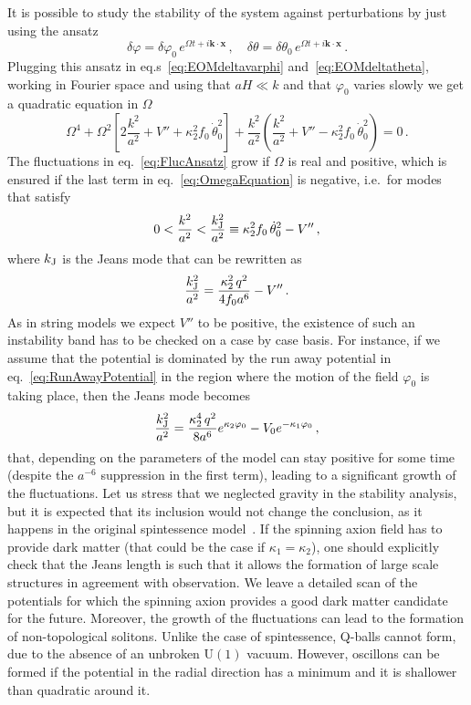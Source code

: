 \documentclass[11pt,a4paper]{article}
\begin{document}
It is possible to study the stability of the system against perturbations by just using the ansatz
\begin{equation}
\label{eq:FlucAnsatz}
\delta \varphi = \delta \varphi_0 \, e^{\Omega t + i \mathbf{k \cdot x}} \,, \quad \delta \theta = \delta \theta_0\, e^{\Omega t + i \mathbf{k \cdot x}} \,.
\end{equation}
Plugging this ansatz in eq.s~\eqref{eq:EOMdeltavarphi} and~\eqref{eq:EOMdeltatheta}, working in Fourier space and using that $a H \ll k$ and that $\varphi_0$ varies slowly we get a quadratic equation in $\Omega$
\begin{equation}
\label{eq:OmegaEquation}
\Omega^4 + \Omega^2 \left[2 \frac{k^2}{a^2} + V'' + \kappa_2^2 f_0 \,\dot\theta_0^2\right] + \frac{k^2}{a^2} \left(\frac{k^2}{a^2} + V'' - \kappa_2^2 f_0\, \dot\theta_0^2\right) = 0 \,.
\end{equation}
The fluctuations in eq.~\eqref{eq:FlucAnsatz} grow if $\Omega$ is real and positive, which is ensured if the last term in eq.~\eqref{eq:OmegaEquation} is negative, i.e.~for modes that satisfy
\begin{equation}
0 < \frac{k^2}{a^2} < \frac{k_{\rm J}^2}{a^2} \equiv \kappa_2^2 f_0 \, \dot\theta_0^2 - V'' \,,
\end{equation}
where $k_{\rm J}$ is the Jeans mode that can be rewritten as
\begin{equation}
\frac{k_{\rm J}^2}{a^2} = \frac{\kappa_2^2\, q^2}{4 f_0 a^6} - V'' \,.
\end{equation}
As in string models we expect $V''$ to be positive, the existence of such an instability band has to be checked on a case by case basis. For instance, if we assume that the potential is dominated by the run away potential in eq.~\eqref{eq:RunAwayPotential} in the region where the motion of the field $\varphi_0$ is taking place, then the Jeans mode becomes
\begin{equation}
\frac{k_{\rm J}^2}{a^2} = \frac{\kappa_2^4 \, q^2}{8 a^6} e^{\kappa_2 \varphi_0} - V_0 e^{-\kappa_1 \varphi_0} \,,
\end{equation}
that, depending on the parameters of the model can stay positive for some time (despite the $a^{-6}$ suppression in the first term), leading to a significant growth of the fluctuations. Let us stress that we neglected gravity in the stability analysis, but it is expected that its inclusion would not change the conclusion, as it happens in the original spintessence model~\cite{Boyle:2001du}. If the spinning axion field has to provide dark matter (that could be the case if $\kappa_1 = \kappa_2$), one should explicitly check that the Jeans length is such that it allows the formation of large scale structures in agreement with observation. We leave a detailed scan of the potentials for which the spinning axion provides a good dark matter candidate for the future. Moreover, the growth of the fluctuations can lead to the formation of non-topological solitons. Unlike the case of spintessence, Q-balls cannot form, due to the absence of an unbroken U$(1)$ vacuum. However, oscillons can be formed if the potential in the radial direction has a minimum and it is shallower than quadratic around it.
\end{document}
